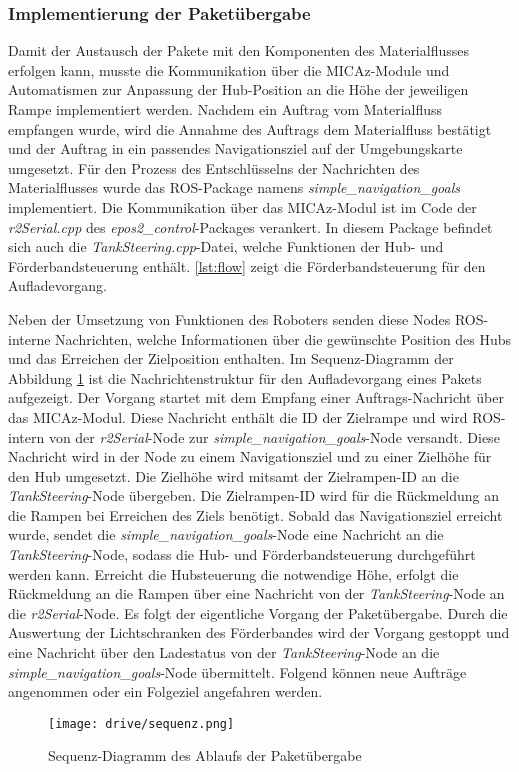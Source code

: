 \subsubsection{Implementierung der Paketübergabe}
Damit der Austausch der Pakete mit den Komponenten des Materialflusses erfolgen kann, musste die Kommunikation über die MICAz-Module und Automatismen zur Anpassung der Hub-Position an die Höhe der jeweiligen Rampe implementiert werden. Nachdem ein Auftrag vom Materialfluss empfangen wurde, wird die Annahme des Auftrags dem Materialfluss bestätigt und der Auftrag in ein passendes Navigationsziel auf der Umgebungskarte umgesetzt. Für den Prozess des Entschlüsselns der Nachrichten des Materialflusses wurde das ROS-Package namens \textit{simple\_navigation\_goals} implementiert. Die Kommunikation über das MICAz-Modul ist im Code der \textit{r2Serial.cpp} des \textit{epos2\_control}-Packages verankert. In diesem Package befindet sich auch die \textit{TankSteering.cpp}-Datei, welche Funktionen der Hub- und Förderbandsteuerung enthält. \autoref{lst:flow} zeigt die Förderbandsteuerung für den Aufladevorgang.



Neben der Umsetzung von Funktionen des Roboters senden diese Nodes ROS-interne Nachrichten, welche Informationen über die gewünschte Position des Hubs und das Erreichen der Zielposition enthalten. Im Sequenz-Diagramm der Abbildung \ref{fig:Paketsequenz} ist die Nachrichtenstruktur für den Aufladevorgang eines Pakets aufgezeigt. Der Vorgang startet mit dem Empfang einer Auftrags-Nachricht über das MICAz-Modul. Diese Nachricht enthält die ID der Zielrampe und wird ROS-intern von der \textit{r2Serial}-Node zur \textit{simple\_navigation\_goals}-Node versandt. Diese Nachricht wird in der Node zu einem Navigationsziel und zu einer Zielhöhe für den Hub umgesetzt. Die Zielhöhe wird mitsamt der Zielrampen-ID an die \textit{TankSteering}-Node übergeben. Die Zielrampen-ID wird für die Rückmeldung an die Rampen bei Erreichen des Ziels benötigt. Sobald das Navigationsziel erreicht wurde, sendet die \textit{simple\_navigation\_goals}-Node eine Nachricht an die \textit{TankSteering}-Node, sodass die Hub- und Förderbandsteuerung durchgeführt werden kann. Erreicht die Hubsteuerung die notwendige Höhe, erfolgt die Rückmeldung an die Rampen über eine Nachricht von der \textit{TankSteering}-Node an die \textit{r2Serial}-Node. Es folgt der eigentliche Vorgang der Paketübergabe. Durch die Auswertung der Lichtschranken des Förderbandes wird der Vorgang gestoppt und eine Nachricht über den Ladestatus von der \textit{TankSteering}-Node an die \textit{simple\_navigation\_goals}-Node übermittelt. Folgend können neue Aufträge angenommen oder ein Folgeziel angefahren werden.

\begin{figure}[h!]
 \centering
		\texttt{[image: drive/sequenz.png]}
	\caption{Sequenz-Diagramm des Ablaufs der Paketübergabe}
	\label{fig:Paketsequenz}
\end{figure}


